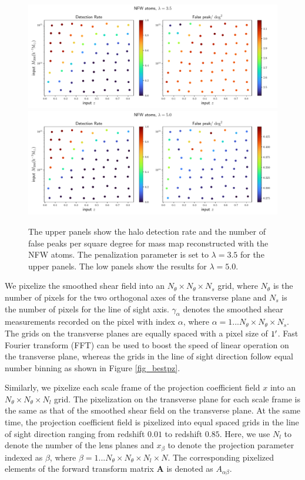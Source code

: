 \documentclass[twocolumn]{aastex62}
\begin{document}
\begin{figure}[!t]
 \centering
 \includegraphics[width=1.0\textwidth]{detfalseRate_f3-1.pdf}
 \includegraphics[width=1.0\textwidth]{detfalseRate_f3-3.pdf}
 \caption{The upper panels show the halo detection rate and the number of false
     peaks per square degree for mass map reconstructed with the NFW atoms. The
     penalization parameter is set to $\lambda=3.5$ for the upper panels.  The
     low panels show the results for $\lambda=5.0$.
        } \label{fig_detFalsRateNFW}
\end{figure}

We pixelize the smoothed shear field into an $N_\theta \times N_\theta \times
N_s$ grid, where $N_\theta$ is the number of pixels for the two orthogonal axes
of the transverse plane and $N_s$ is the number of pixels for the line of sight
axis. $\gamma_{\alpha}$ denotes the smoothed shear measurements recorded on the
pixel with index $\alpha$, where $\alpha=1...N_\theta \times N_\theta \times
N_s$. The grids on the transverse planes are equally spaced with a pixel size of
$1\mbox{$^\prime$}$.  Fast Fourier transform (FFT) can be used to boost the speed of
linear operation on the transverse plane, whereas the grids in the line of sight
direction follow equal number binning as shown in Figure \ref{fig_bestpz}.

Similarly, we pixelize each scale frame of the projection coefficient field $x$
into an $N_\theta \times N_\theta \times N_l$ grid. The pixelization on the
transverse plane for each scale frame is the same as that of the
smoothed shear field on the transverse plane. At the same time, the projection
coefficient field is pixelized into equal spaced grids in the line of sight
direction ranging from redshift $0.01$ to redshift $0.85$. Here, we use $N_l$
to denote the number of the lens planes and $x_{\beta}$ to denote the
projection parameter indexed as $\beta$, where $\beta=1...N_\theta \times
N_\theta \times N_l \times N$. The corresponding pixelized elements of the
forward transform matrix $\mathbf{A}$ is denoted as $A_{\alpha\beta}$.
\end{document}
